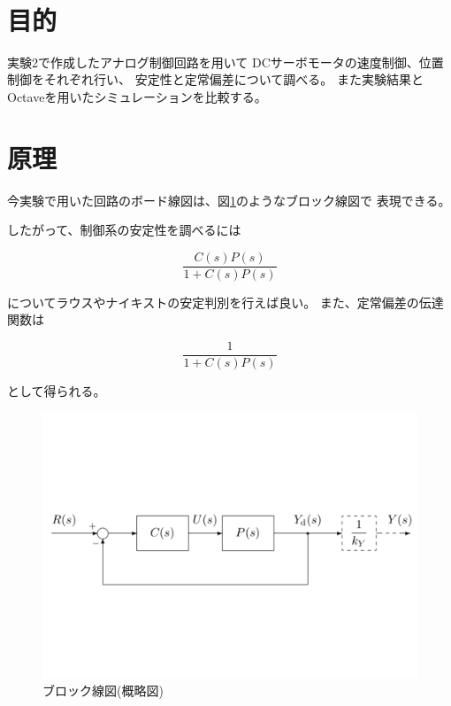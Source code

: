 \documentclass[uplatex, 11pt,a4j, titlepage]{jsarticle}
\begin{document}

\newpage




\newpage
\ 
\newpage


\section{目的}
実験2で作成したアナログ制御回路を用いて
DCサーボモータの速度制御、位置制御をそれぞれ行い、
安定性と定常偏差について調べる。
また実験結果とOctaveを用いたシミュレーションを比較する。

\section{原理}

今実験で用いた回路のボード線図は、図\ref{gaizu}のようなブロック線図で
表現できる。

したがって、制御系の安定性を調べるには

\begin{equation}\label{antei}
    \frac{C(s)P(s)}{1+C(s)P(s)}
\end{equation}

についてラウスやナイキストの安定判別を行えば良い。
また、定常偏差の伝達関数は

\begin{equation}\label{hensa}
    \frac{1}{1+C(s)P(s)}
\end{equation}

として得られる。

\begin{figure}[h]
    \centering
    \includegraphics[width=12cm]{gaizu.pdf}
    \caption{ブロック線図(概略図)}
    \label{gaizu}
\end{figure}
\end{document}

